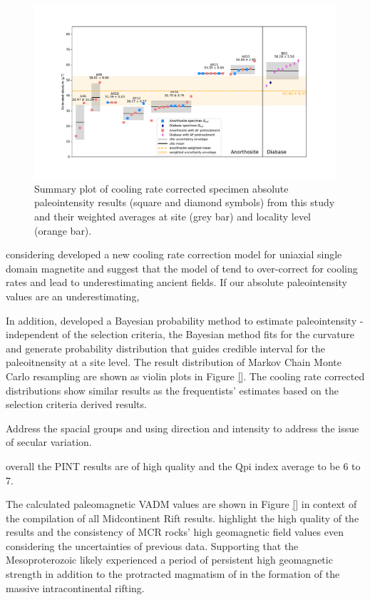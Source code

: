 \documentclass[draft]{agujournal2019}
\begin{document}
\begin{figure}[h!]
\noindent\includegraphics[width=\textwidth]{Paleointensity_plot_cooling_corrected.pdf}
\centering
\caption{\small{Summary plot of cooling rate corrected specimen absolute paleointensity results (square and diamond symbols) from this study and their weighted averages at site (grey bar) and locality level (orange bar). }}
\label{fig:PINT_cooling_corrected}
\end{figure}


considering  developed a new cooling rate correction model for uniaxial single domain magnetite and suggest that the model of  tend to over-correct for cooling rates and lead to underestimating ancient fields. If our absolute paleointensity values are an underestimating, 


In addition, \cite{Cych2021a} developed a Bayesian probability method to estimate paleointensity - independent of the selection criteria, the Bayesian method fits for the curvature and generate probability distribution that guides credible interval for the paleoitnensity at a site level. The result distribution of Markov Chain Monte Carlo resampling are shown as violin plots in Figure \ref{}. The cooling rate corrected distributions show similar results as the frequentists' estimates based on the selection criteria derived results. 

Address the spacial groups and using direction and intensity to address the issue of secular variation. 

overall the PINT results are of high quality and the Qpi index average to be 6 to 7. 

The calculated paleomagnetic VADM values are shown in Figure \ref{} in context of the compilation of all Midcontinent Rift results. highlight the high quality of the results and the consistency of MCR rocks' high geomagnetic field values even considering the uncertainties of previous data. Supporting that the Mesoproterozoic likely experienced a period of persistent high geomagnetic strength in addition to the protracted magmatism of in the formation of the massive intracontinental rifting. 
\end{document}
